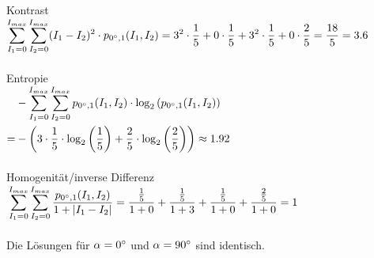 \begin{enumerate}[I]
	      Kontrast\\
	      $\begin{aligned}[t]
			      \sum_{I_1=0}^{I_{max}}\sum_{I_2=0}^{I_{max}} (I_1-I_2)^2 \cdot p_{0\degree,1}(I_1,I_2)
			      =3^2 \cdot \frac{1}{5} + 0 \cdot \frac{1}{5} + 3^2 \cdot \frac{1}{5} + 0 \cdot \frac{2}{5}  = \frac{18}{5}= 3.6 \\
		      \end{aligned}$\\\\

	      Entropie\\
	      $\begin{aligned}[t]
			        & -  \sum_{I_1=0}^{I_{max}}\sum_{I_2=0}^{I_{max}}  p_{0\degree,1}(I_1,I_2) \cdot \log_2 \left( p_{0\degree,1}(I_1,I_2) \right) \\
			      = & - \left(3 \cdot \frac{1}{5} \cdot \log_2\left(\frac{1}{5}\right)
			      +  \frac{2}{5} \cdot \log_2\left(\frac{2}{5}\right)
			      \right) \approx 1.92                                                                                                             \\
		      \end{aligned}$\\\\

	      Homogenität/inverse Differenz\\
	      $\begin{aligned}[t]
			       & \sum_{I_1=0}^{I_{max}}\sum_{I_2=0}^{I_{max}}  \frac{p_{0\degree,1}(I_1,I_2)}{1 + |I_1-I_2|}
			      =  \frac{\frac{1}{5}}{1 + 0} + \frac{\frac{1}{5}}{1 + 3} + \frac{\frac{1}{5}}{1 + 0} + \frac{\frac{2}{5}}{1 + 0} = 1 \\
		      \end{aligned}$\\\\

	      Die Lösungen für $\alpha = 0\degree$ und $\alpha = 90\degree$ sind identisch.
\end{enumerate}